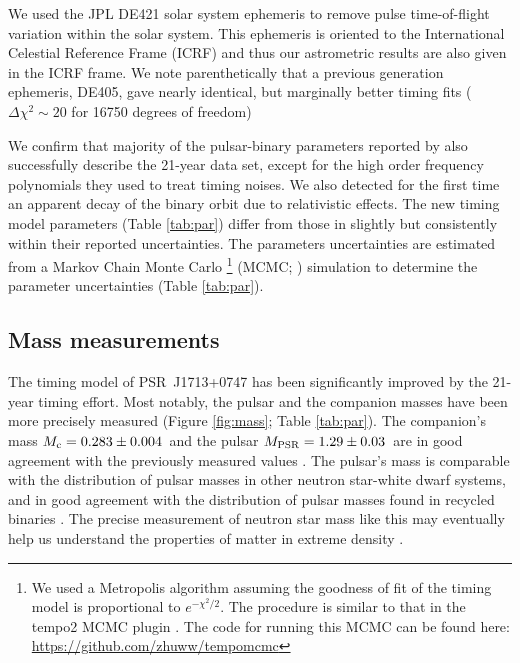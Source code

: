 We used the JPL DE421 solar system ephemeris \citep{fwb09} to remove pulse
time-of-flight variation within the solar system. This ephemeris is oriented
to the International Celestial Reference Frame (ICRF) and thus our astrometric
results are also given in the ICRF frame. We note parenthetically that a
previous generation ephemeris, DE405, gave nearly identical, but marginally
better timing fits ($\Delta\chi^2\sim20$ for 16750 degrees of freedom)


We confirm that majority of the pulsar-binary parameters reported by
\citet{sns+05} also successfully describe the 21-year data set, except for the
high order frequency polynomials they used to treat timing noises. We also
detected for the first time an apparent decay of the binary orbit due to
relativistic effects.
The new timing model parameters (Table \ref{tab:par}) differ from
those in \citet{sns+05} slightly but consistently within their reported uncertainties.
The parameters uncertainties are estimated from a Markov Chain Monte Carlo
\footnote{{\bfref We used a Metropolis algorithm assuming the goodness of fit of
the timing model is proportional to $e^{-\chi^2/2}$. The procedure is similar
to that in the {\sc tempo2} MCMC plugin \citep{dpr+10}. The code for running this
MCMC can be found here: \url{https://github.com/zhuww/tempomcmc}}}  
(MCMC; \citealt{NR3}) simulation to determine the parameter uncertainties (Table \ref{tab:par}).



\subsection{Mass measurements}
\label{sec:mass}
The timing model of PSR~J1713+0747 has been significantly improved by the 21-year timing effort.
Most notably, the pulsar and the companion masses have been more precisely measured
(Figure \ref{fig:mass}; Table \ref{tab:par}). The
companion's mass $M_{\rm c} = 0.283\pm0.004$~\Msun and the pulsar $M_{\rm
PSR}=1.29\pm0.03$~\Msun are in good agreement with the previously measured values \cite{sns+05}.
The pulsar's mass is comparable with the distribution of pulsar masses
in other neutron star-white dwarf systems, and in good
agreement with the distribution of pulsar masses found in recycled binaries
\citep{opns12,kkdt13}. The precise measurement of neutron star mass like this
may eventually help us understand the properties of matter in extreme 
density \citep{lat12}.

